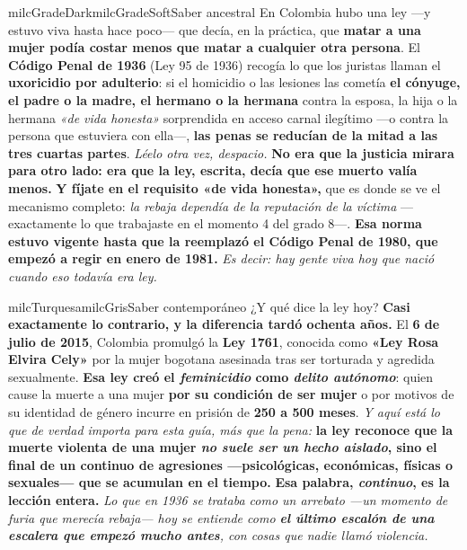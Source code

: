 \documentclass[11pt,letterpaper]{article}
\begin{document}
\begin{softbox}{milcGradeDark}{milcGradeSoft}{Saber ancestral}
En Colombia hubo una ley ---y estuvo viva hasta hace poco--- que decía, en la práctica, que \textbf{matar a una mujer podía costar menos que matar a cualquier otra persona}. El \textbf{Código Penal de 1936} (Ley 95 de 1936) recogía lo que los juristas llaman el \textbf{uxoricidio por adulterio}: si el homicidio o las lesiones las cometía \textbf{el cónyuge, el padre o la madre, el hermano o la hermana} contra la esposa, la hija o la hermana \emph{«de vida honesta»} sorprendida en acceso carnal ilegítimo ---o contra la persona que estuviera con ella---, \textbf{las penas se reducían de la mitad a las tres cuartas partes}. \emph{Léelo otra vez, despacio.} \textbf{No era que la justicia mirara para otro lado: era que la ley, escrita, decía que ese muerto valía menos.} \textbf{Y fíjate en el requisito «de vida honesta»,} que es donde se ve el mecanismo completo: \emph{la rebaja dependía de la reputación de la víctima} ---exactamente lo que trabajaste en el momento 4 del grado 8---. \textbf{Esa norma estuvo vigente hasta que la reemplazó el Código Penal de 1980, que empezó a regir en enero de 1981.} \emph{Es decir: hay gente viva hoy que nació cuando eso todavía era ley.}
\end{softbox}

\begin{softbox}{milcTurquesa}{milcGris}{Saber contemporáneo}
¿Y qué dice la ley hoy? \textbf{Casi exactamente lo contrario, y la diferencia tardó ochenta años.} El \textbf{6 de julio de 2015}, Colombia promulgó la \textbf{Ley 1761}, conocida como \textbf{«Ley Rosa Elvira Cely»} por la mujer bogotana asesinada tras ser torturada y agredida sexualmente. \textbf{Esa ley creó el \emph{feminicidio} como \emph{delito autónomo}}: quien cause la muerte a una mujer \textbf{por su condición de ser mujer} o por motivos de su identidad de género incurre en prisión de \textbf{250 a 500 meses}. \emph{Y aquí está lo que de verdad importa para esta guía, más que la pena:} \textbf{la ley reconoce que la muerte violenta de una mujer \emph{no suele ser un hecho aislado}, sino el final de \textbf{un continuo} de agresiones ---psicológicas, económicas, físicas o sexuales--- que se acumulan en el tiempo.} \textbf{Esa palabra, \emph{continuo}, es la lección entera.} \emph{Lo que en 1936 se trataba como un arrebato ---un momento de furia que merecía rebaja--- hoy se entiende como \textbf{el último escalón de una escalera que empezó mucho antes}, con cosas que nadie llamó violencia.}
\end{softbox}
\end{document}
